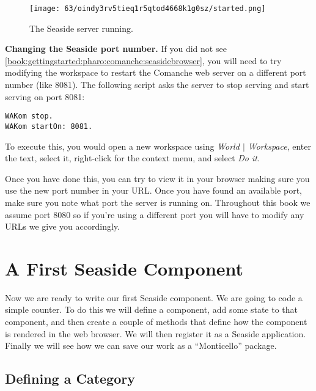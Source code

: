 \documentclass[a4paper,10pt,twoside]{book}
\newcommand{\ct}[1]{{\small\ttfamily\textup{#1}}}
\begin{document}
\begin{figure}[h!tbp]
	\begin{center}
		\texttt{[image: 63/oindy3rv5tieq1r5qtod4668k1g0sz/started.png]}
		\caption{The Seaside server running.\label{book:gettingstarted:pharo:comanche:seasidebrowser}}
	\end{center}
\end{figure}


\textbf{Changing the Seaside port number.} If you did not see \autoref{book:gettingstarted:pharo:comanche:seasidebrowser}, you will need to try modifying the workspace to restart the Comanche web server on a different port number (like 8081). The following script asks the server to stop serving and start serving on port 8081:

\begin{lstlisting}
WAKom stop.
WAKom startOn: 8081.
\end{lstlisting}

To execute this, you would open a new workspace using \textit{World $|$ Workspace}, enter the text, select it, right-click for the context menu, and select \textit{Do it}. 

Once you have done this, you can try to view it in your browser making sure you use the new port number in your URL. Once you have found an available port, make sure you note what port the server is running on. Throughout this book we assume port \ct{8080} so if you're using a different port you will have to modify any URLs we give you accordingly.

\section{A First Seaside Component}
\label{book:gettingstarted:pharo:firstcomponent}

Now we are ready to write our first Seaside component. We are going to code a simple counter. To do this we will define a component, add some state to that component, and then create a couple of methods that define how the component is rendered in the web browser. We will then register it as a Seaside application. Finally we will see how we can save our work as a ``Monticello'' package.

\subsection{Defining a Category}
\label{book:gettingstarted:pharo:firstcomponent:package}
\end{document}
